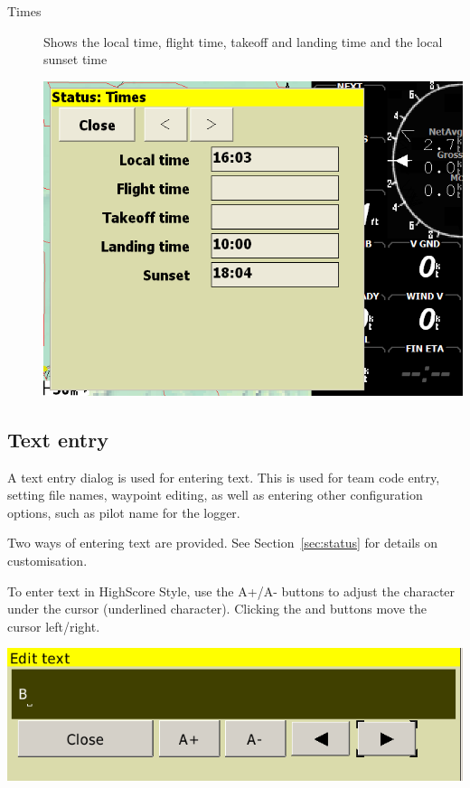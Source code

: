 \documentclass[a4paper,12pt]{refrep}
\begin{document}
\begin{description}
\item[Times]  Shows the local time, flight time, takeoff and landing time and
the local sunset time
\begin{center}
\includegraphics[angle=0,width=\linewidth,keepaspectratio='true']{figures/status-times.png}
\end{center}
\end{description}

\subsection*{Text entry}
A text entry dialog is used for entering text.  This is used for team
code entry, setting file names, waypoint editing, as well as entering
other configuration options, such as pilot name for the logger.

Two ways of entering text are provided. See Section~\ref{sec:status} for details on customisation.

To enter text in HighScore Style, use the A+/A- buttons to adjust the character under the
cursor (underlined character). Clicking the \button{$<$} and \button{$>$} buttons move the
cursor left/right.  

\begin{center}
\includegraphics[angle=0,width=\linewidth,keepaspectratio='true']{figures/textentry.png}
\end{center}
\end{document}
